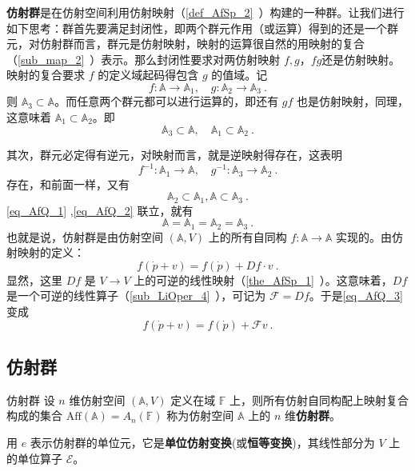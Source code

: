 
\textbf{仿射群}是在仿射空间利用仿射映射（\autoref{def_AfSp_2}~）构建的一种群。让我们进行如下思考：群首先要满足封闭性，即两个群元作用（或运算）得到的还是一个群元，对仿射群而言，群元是仿射映射，映射的运算很自然的用映射的复合（\autoref{sub_map_2}~）表示。那么封闭性要求对两仿射映射 $f,g$，$fg$还是仿射映射。映射的复合要求 $f$ 的定义域起码得包含 $g$ 的值域。记
 \begin{equation}
f:\mathbb A\rightarrow\mathbb A_1,\quad g:\mathbb A_2\rightarrow \mathbb A_3~.
 \end{equation}
 则 $\mathbb A_3\subset \mathbb A$。而任意两个群元都可以进行运算的，即还有 $gf$ 也是仿射映射，同理，这意味着 $\mathbb A_1\subset\mathbb A_2$。即
 \begin{equation}\label{eq_AfQ_1}
 \mathbb A_3\subset \mathbb A,\quad \mathbb A_1\subset\mathbb A_2~.
 \end{equation}
 
 其次，群元必定得有逆元，对映射而言，就是逆映射得存在，这表明
\begin{equation}
 f^{-1}:\mathbb A_1\rightarrow\mathbb A,\quad g^{-1}:\mathbb A_3\rightarrow\mathbb A_2~.
\end{equation}
 存在，和前面一样，又有
 \begin{equation}\label{eq_AfQ_2}
 \mathbb A_2\subset \mathbb A_1, \mathbb A\subset\mathbb A_3~.
 \end{equation}
 \autoref{eq_AfQ_1} ,\autoref{eq_AfQ_2} 联立，就有
 \begin{equation}
 \mathbb A=\mathbb A_1= \mathbb A_2=\mathbb A_3~.
 \end{equation}
 也就是说，仿射群是由仿射空间 $(\mathbb A,V)$ 上的所有自同构 $f:\mathbb A\rightarrow\mathbb A$ 实现的。由仿射映射的定义：
 \begin{equation}\label{eq_AfQ_3}
 f(\dot p+v)=f(\dot p)+Df\cdot v~.
 \end{equation}
 显然，这里 $Df$ 是 $V\rightarrow V$ 上的可逆的线性映射（\autoref{the_AfSp_1}~）。这意味着，$Df$ 是一个可逆的线性算子（\autoref{sub_LiOper_4}~），可记为 $\mathcal F=Df$。于是\autoref{eq_AfQ_3} 变成
 \begin{equation}
 f(\dot p+v)=f(\dot p)+\mathcal F v~.
 \end{equation}
 \subsection{仿射群}
 \begin{definition}{仿射群}
 设 $n$ 维仿射空间 $(\mathbb A,V)$ 定义在域 $\mathbb F$ 上，则所有仿射自同构配上映射复合构成的集合 $\mathrm{Aff}(\mathbb A)=A_n(\mathbb F)$ 称为仿射空间 $\mathbb A$ 上的 $n$ 维\textbf{仿射群}。
 \end{definition}
 用 $e$ 表示仿射群的单位元，它是\textbf{单位仿射变换}(或\textbf{恒等变换})，其线性部分为 $V$ 上的单位算子 $\mathcal E$。

